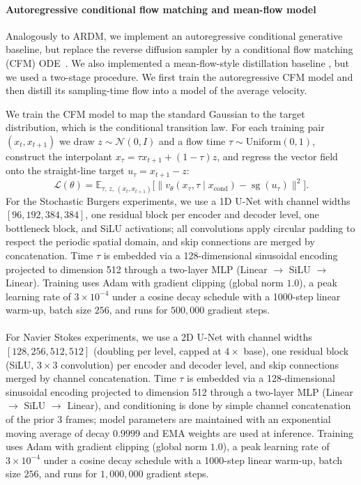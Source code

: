 \documentclass[oneside,11pt]{article}
\theoremstyle{remark}
\begin{document}
\paragraph{Autoregressive conditional flow matching and mean-flow model} Analogously to ARDM, we implement an autoregressive conditional generative baseline, but replace the reverse diffusion sampler by a conditional flow matching (CFM) ODE~\cite{albergo-vanden-eijnden:2022,lipman2023flow}. We also implemented a mean-flow-style distillation baseline \cite{geng2025mean,boffi2025how}, but we used a two-stage procedure. We first train the autoregressive CFM model and then distill its sampling-time flow into a model of the average velocity.  



We train the CFM model to map the standard Gaussian to the target distribution, which is the conditional transition law. For each training pair $(x_t, x_{t+1})$ we draw $z \sim \mathcal{N}(0,I)$ and a flow time $\tau \sim \mathrm{Uniform}(0,1)$, construct the interpolant $x_\tau = \tau x_{t+1} + (1{-}\tau)z$, and regress the vector field onto the straight-line target $u_\tau = x_{t+1} - z$:
\begin{equation}
    \mathcal{L}(\theta)
    = \mathbb{E}_{\tau,\,z,\,(x_t,x_{t+1})}
      \bigl[\|v_\theta(x_\tau,\tau \mid x_{\mathrm{cond}}) - \operatorname{sg}(u_\tau)\|^2\bigr].
\end{equation}
For the Stochastic Burgers experiments, we use a 1D U-Net with channel widths $[96, 192, 384, 384]$, one residual block per encoder and decoder level, one bottleneck block, and SiLU activations; all convolutions apply circular padding to respect the periodic spatial domain, and skip connections are merged by concatenation. Time $\tau$ is embedded via a 128-dimensional sinusoidal encoding projected to dimension 512 through a  two-layer MLP (Linear $\to$ SiLU $\to$ Linear). Training uses Adam with gradient clipping (global norm $1.0$), a peak learning rate of $3 \times 10^{-4}$ under a cosine decay schedule with a 1000-step linear warm-up, batch size $256$, and runs for $500{,}000$ gradient steps. \\ \\
For Navier Stokes experiments, we use a 2D U-Net with channel widths $[128, 256, 512, 512]$ (doubling per level, capped at $4\times$ base), one residual block        
  (SiLU, $3{\times}3$ convolution) per encoder and decoder level, and skip connections merged by channel
  concatenation. Time $\tau$ is embedded via a 128-dimensional sinusoidal encoding
  projected to dimension 512 through a two-layer MLP (Linear $\to$ SiLU $\to$ Linear), and conditioning is done by simple channel concatenation of the prior 3 frames; model parameters are
  maintained with an exponential moving average of decay $0.9999$ and EMA weights are used at inference. Training uses Adam with
  gradient clipping (global norm $1.0$), a peak learning rate of $3 \times 10^{-4}$ under a cosine decay schedule with a 1000-step
  linear warm-up, batch size $256$, and runs for $1{,}000{,}000$ gradient steps.
\end{document}
